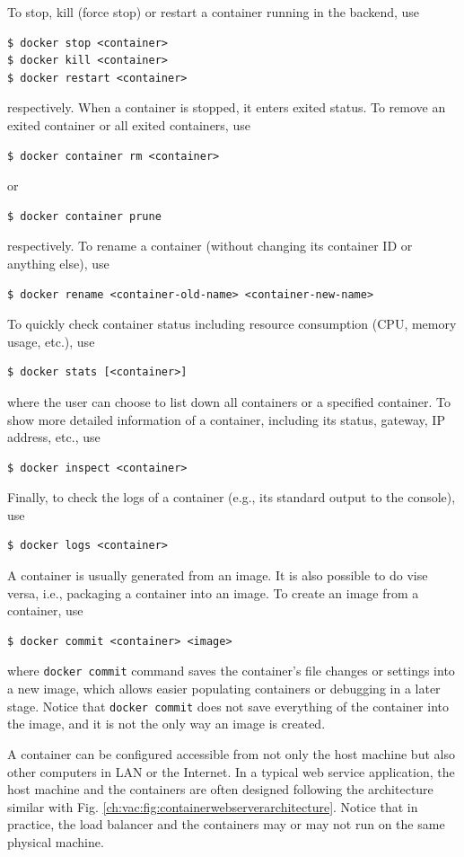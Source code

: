 To stop, kill (force stop) or restart a container running in the backend, use
\begin{lstlisting}
$ docker stop <container>
$ docker kill <container>
$ docker restart <container>
\end{lstlisting}
respectively. When a container is stopped, it enters exited status. To remove an exited container or all exited containers, use
\begin{lstlisting}
$ docker container rm <container>
\end{lstlisting}
or
\begin{lstlisting}
$ docker container prune
\end{lstlisting}
respectively. To rename a container (without changing its container ID or anything else), use
\begin{lstlisting}
$ docker rename <container-old-name> <container-new-name>
\end{lstlisting}

To quickly check container status including resource consumption (CPU, memory usage, etc.), use
\begin{lstlisting}
$ docker stats [<container>]
\end{lstlisting}
where the user can choose to list down all containers or a specified container. To show more detailed information of a container, including its status, gateway, IP address, etc., use
\begin{lstlisting}
$ docker inspect <container>
\end{lstlisting}
Finally, to check the logs of a container (e.g., its standard output to the console), use
\begin{lstlisting}
$ docker logs <container>
\end{lstlisting}

A container is usually generated from an image. It is also possible to do vise versa, i.e., packaging a container into an image. To create an image from a container, use
\begin{lstlisting}
$ docker commit <container> <image>
\end{lstlisting}
where \verb|docker commit| command saves the container's file changes or settings into a new image, which allows easier populating containers or debugging in a later stage. Notice that \verb|docker commit| does not save everything of the container into the image, and it is not the only way an image is created.

A container can be configured accessible from not only the host machine but also other computers in LAN or the Internet. In a typical web service application, the host machine and the containers are often designed following the architecture similar with Fig. \ref{ch:vac:fig:containerwebserverarchitecture}. Notice that in practice, the load balancer and the containers may or may not run on the same physical machine.

